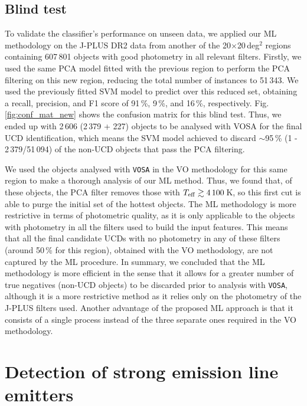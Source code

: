 \subsection{Blind test} \label{blind_test}

To validate the classifier's performance on unseen data, we applied our ML methodology on the J-PLUS DR2 data from another of the 20$\times$20\,deg$^2$ regions containing 607\,801 objects with good photometry in all relevant filters. Firstly, we used the same PCA model fitted with the previous region to perform the PCA filtering on this new region, reducing the total number of instances to 51\,343. We used the previously fitted SVM model to predict over this reduced set, obtaining a recall, precision, and F1 score of 91\,\%, 9\,\%, and 16\,\%, respectively. Fig. \ref{fig:conf_mat_new} shows the confusion matrix for this blind test. Thus, we ended up with 2\,606 (2\,379 + 227) objects to be analysed with VOSA for the final UCD identification, which means the SVM model achieved to discard $\sim$95\,\% (1 - 2\,379/51\,094) of the non-UCD objects that pass the PCA filtering.

We used the objects analysed with \texttt{VOSA} in the VO methodology for this same region to make a thorough analysis of our ML method. Thus, we found that, of these objects, the PCA filter removes those with $T_{\rm eff}\gtrsim4\,100$\,K, so this first cut is able to purge the initial set of the hottest objects. The ML methodology is more restrictive in terms of photometric quality, as it is only applicable to the objects with photometry in all the filters used to build the input features. This means that all the final candidate UCDs with no photometry in any of these filters (around 50\,\% for this region), obtained with the VO methodology, are not captured by the ML procedure. In summary, we concluded that the ML methodology is more efficient in the sense that it allows for a greater number of true negatives (non-UCD objects) to be discarded prior to analysis with \texttt{VOSA}, although it is a more restrictive method as it relies only on the photometry of the J-PLUS filters used. Another advantage of the proposed ML approach is that it consists of a single process instead of the three separate ones required in the VO methodology.


\section{Detection of strong emission line emitters} \label{flares}


